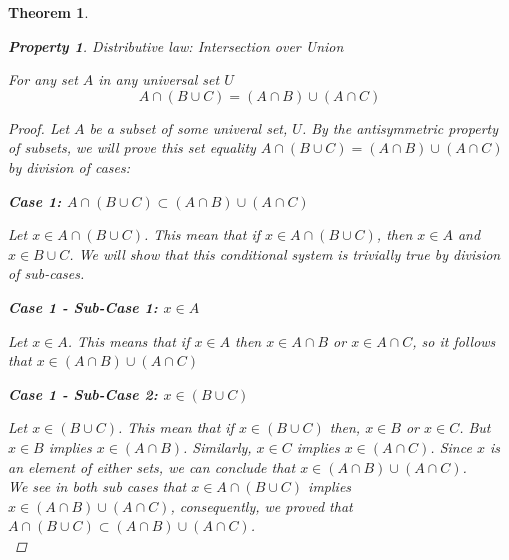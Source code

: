 \documentclass{book}
\newtheorem{theorem}{Theorem}[section]
\newtheorem{property}{Property}[theorem]
\theoremstyle{definition}
\theoremstyle{remark}
\begin{document}
\begin{theorem}
    
    \newpage
    \begin{property}
    Distributive law: Intersection over Union \\
        \begin{tcolorbox}
            For any set $A$ in any universal set $U$
                \begin{equation*}
                    A \cap (B \cup C) = (A \cap B) \cup (A \cap C)
                \end{equation*}
        \end{tcolorbox}
    
        \begin{proof}
            Let $A$ be a subset of some univeral set, $U$. By the antisymmetric property of subsets, we will prove this set equality $A \cap (B \cup C) = (A \cap B) \cup (A \cap C)$ by division of cases: \\
            
            \begin{flushleft} \textbf{Case 1: $A \cap (B \cup C) \subset (A \cap B) \cup (A \cap C)$} \end{flushleft}
                Let $x \in A \cap (B \cup C)$. This mean that if $x \in A \cap (B \cup C)$, then $x \in A$ and $x \in B \cup C$. We will show that this conditional system is trivially true by division of sub-cases. \\
                
                    \begin{flushleft} \textbf{Case 1 - Sub-Case 1: $x \in A$} \end{flushleft}
                        Let $x \in A$. This means that if $x \in A$ then $x \in A \cap B$ or $x \in A \cap C$, so it follows that $x \in (A \cap B) \cup (A \cap C)$ \\
                    
                    \begin{flushleft} \textbf{Case 1 - Sub-Case 2: $x \in (B \cup C)$} \end{flushleft}  
                        Let $x \in (B \cup C)$. This mean that if $x \in (B \cup C)$ then, $x \in B$ or $x \in C$.  But $x \in B$ implies $x \in (A \cap B)$. Similarly, $x \in C$ implies $x \in (A \cap C)$. Since $x$ is an element of either sets, we can conclude that $x \in (A \cap B) \cup (A \cap C)$. \\
                
                We see in both sub cases that $x \in A \cap (B \cup C)$ implies $x \in (A \cap B) \cup (A \cap C)$, consequently, we proved that $A \cap (B \cup C) \subset (A \cap B) \cup (A \cap C)$. \\
                

\end{proof}
\end{property}
\end{theorem}
\end{document}
